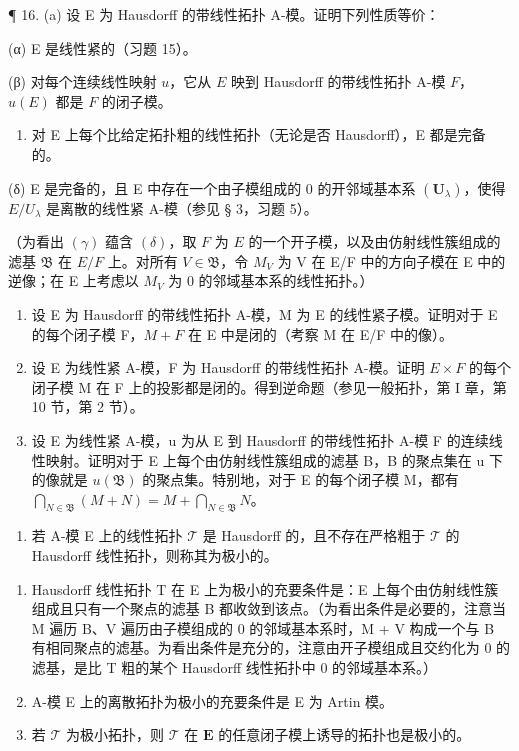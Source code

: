 ¶ 16. (a) 设 E 为 Hausdorff 的带线性拓扑 A-模。证明下列性质等价：

(α) E 是线性紧的（习题 15）。

(β) 对每个连续线性映射 \(u\)，它从 \(E\) 映到 Hausdorff 的带线性拓扑 A-模 \(F\)，\(u(E)\) 都是 \(F\) 的闭子模。

\begin{enumerate}
\def\labelenumi{(\Alph{enumi})}
\setcounter{enumi}{24}
\tightlist
\item[(γ)]
  对 E 上每个比给定拓扑粗的线性拓扑（无论是否 Hausdorff），E 都是完备的。
\end{enumerate}

(δ) E 是完备的，且 E 中存在一个由子模组成的 0 的开邻域基本系 \((\mathbf{U}_{\lambda})\)，使得 \(E/U_{\lambda}\) 是离散的线性紧 A-模（参见 § 3，习题 5）。~

（为看出 \((\gamma)\) 蕴含 \((\delta)\)，取 \(F\) 为 \(E\) 的一个开子模，以及由仿射线性簇组成的滤基 \(\mathfrak{B}\) 在 \(E / F\) 上。对所有 \(V \in \mathfrak{B}\)，令 \(M_V\) 为 V 在 E/F 中的方向子模在 E 中的逆像；在 E 上考虑以 \(M_{V}\) 为 0 的邻域基本系的线性拓扑。）

\begin{enumerate}
\def\labelenumi{(\alph{enumi})}
\setcounter{enumi}{1}
\item
  设 E 为 Hausdorff 的带线性拓扑 A-模，M 为 E 的线性紧子模。证明对于 E 的每个闭子模 F，\(M + F\) 在 E 中是闭的（考察 M 在 E/F 中的像）。
\item
  设 E 为线性紧 A-模，F 为 Hausdorff 的带线性拓扑 A-模。证明 \(E \times F\) 的每个闭子模 M 在 F 上的投影都是闭的。得到逆命题（参见一般拓扑，第 I 章，第 10 节，第 2 节）。~
\item
  设 E 为线性紧 A-模，u 为从 E 到 Hausdorff 的带线性拓扑 A-模 F 的连续线性映射。证明对于 E 上每个由仿射线性簇组成的滤基 B，B 的聚点集在 u 下的像就是 \(u(\mathfrak{B})\) 的聚点集。特别地，对于 E 的每个闭子模 M，都有 \(\bigcap_{N\in\mathfrak{B}}(M+N)=M+\bigcap_{N\in\mathfrak{B}}N\)。
\end{enumerate}

\begin{enumerate}
\def\labelenumi{\arabic{enumi}.}
\setcounter{enumi}{16}
\tightlist
\item
  若 A-模 E 上的线性拓扑 \(\mathcal{T}\) 是 Hausdorff 的，且不存在严格粗于 \(\mathcal{T}\) 的 Hausdorff 线性拓扑，则称其为极小的。
\end{enumerate}

\begin{enumerate}
\def\labelenumi{(\alph{enumi})}
\item
  Hausdorff 线性拓扑 T 在 E 上为极小的充要条件是：E 上每个由仿射线性簇组成且只有一个聚点的滤基 B 都收敛到该点。（为看出条件是必要的，注意当 M 遍历 B、V 遍历由子模组成的 0 的邻域基本系时，M + V 构成一个与 B 有相同聚点的滤基。为看出条件是充分的，注意由开子模组成且交约化为 0 的滤基，是比 T 粗的某个 Hausdorff 线性拓扑中 0 的邻域基本系。）
\item
  A-模 E 上的离散拓扑为极小的充要条件是 E 为 Artin 模。
\item
  若 \(\mathcal{T}\) 为极小拓扑，则 \(\mathcal{T}\) 在 \(\mathbf{E}\) 的任意闭子模上诱导的拓扑也是极小的。
\end{enumerate}

